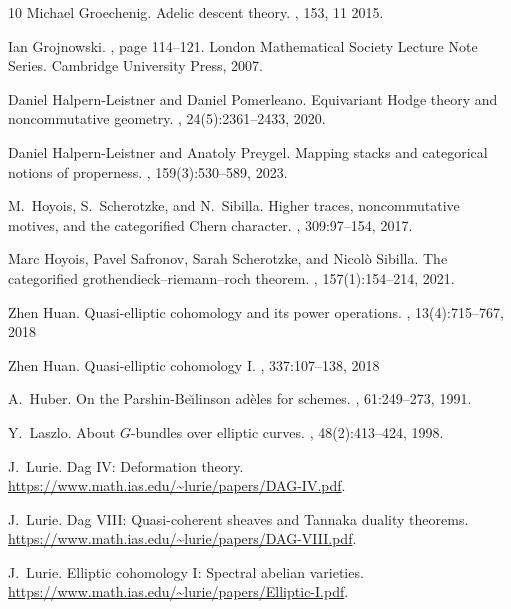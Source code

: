 \documentclass[11pt,letterpaper]{amsart}
\begin{document}
\begin{thebibliography}{10}
Michael Groechenig.
\newblock Adelic descent theory.
, 153, 11 2015.

Ian Grojnowski.
, page 114–121.
\newblock London Mathematical Society Lecture Note Series. Cambridge University
  Press, 2007.

Daniel Halpern-Leistner and Daniel Pomerleano.
\newblock Equivariant {H}odge theory and noncommutative geometry.
, 24(5):2361--2433, 2020.

Daniel Halpern-Leistner and Anatoly Preygel.
\newblock Mapping stacks and categorical notions of properness.
, 159(3):530--589, 2023.

M.~Hoyois, S.~Scherotzke, and N.~Sibilla.
\newblock Higher traces, noncommutative motives, and the categorified {C}hern
  character.
, 309:97--154, 2017.

Marc Hoyois, Pavel Safronov, Sarah Scherotzke, and Nicolò Sibilla.
\newblock The categorified grothendieck–riemann–roch theorem.
, 157(1):154–214, 2021.

Zhen Huan. 
\newblock Quasi-elliptic cohomology and its power operations. 
,
13(4):715–767, 2018

Zhen Huan. 
\newblock Quasi-elliptic cohomology {I}.
, 337:107–138, 2018

A.~Huber.
\newblock On the {P}arshin-{B}e\u{\i}linson ad\`eles for schemes.
, 61:249--273, 1991.

Y.~Laszlo.
\newblock About {$G$}-bundles over elliptic curves.
, 48(2):413--424, 1998.

J.~Lurie.
\newblock Dag {IV}: Deformation theory.
\newblock \url{https://www.math.ias.edu/~lurie/papers/DAG-IV.pdf}.

J.~Lurie.
\newblock Dag {VIII}: Quasi-coherent sheaves and {T}annaka duality theorems.
\newblock \url{https://www.math.ias.edu/~lurie/papers/DAG-VIII.pdf}.

J.~Lurie.
\newblock Elliptic cohomology {I}: Spectral abelian varieties.
\newblock \url{https://www.math.ias.edu/~lurie/papers/Elliptic-I.pdf}.


\end{thebibliography}
\end{document}
